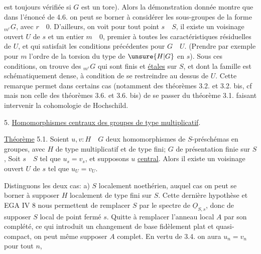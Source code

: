 est toujours vérifiée si $G$ est un tore). Alors la démonstration donnée
montre que dans l'énoncé de 4.6.  on peut se borner à considérer les
sous-groupes de la forme ${}_{m^r}G$, avec $r\quad 0$. D'ailleurs, on voit 
  pour tout point $s\quad S$, il existe un voisinage ouvert $U$ de $s$ 
et un entier $m\quad 0$, premier à toutes les caractéristiques 
résiduelles de $U$, et qui satisfait les conditions précédentes pour $G\quad U$.
(Prendre par exemple pour $m$ l'ordre de la torsion du type de $\unsure{H|G}$ 
en $s$). Sous ces conditions, on trouve des ${}_{m^r}G$ qui sont finis et
\uline{étales} sur $S$, et dont la famille est schématiquement dense, à condition
de se restreindre au dessus de $U$. Cette remarque permet dans certains
cas (notamment   des théorèmes 3.2. et 3.2. bis, cf
mais non celle des théorèmes 3.6. et 3.6. bis) de se passer du théorème 3.1. faisant intervenir la cohomologie de Hochschild. 

5. \uline{Homomorphismes centraux des groupes de type multiplicatif}.

\uline{Théorème} 5.1. Soient $u,v:H\quad G$ deux homomorphismes de $S$-préschémas en groupes, avec $H$ de type multiplicatif et de type fini;  $G$ de présentation finie sur $S$, 
Soit $s\quad S$ tel que $u_s=v_s$, et supposons $u$ \uline{central}. Alors il existe
un voisinage ouvert $U$ de $s$ tel que $u_U=v_U$.

Distinguons les deux cas: a) $S$ localement noethérien, auquel cas
on peut se borner à supposer $H$ localement de type fini sur $S$. Cette
dernière hypothèse et EGA IV 8 nous permettent de remplacer $S$ par
le spectre de $\underline{O}_{S,s}$, donc de supposer $S$ local de point fermé $s$. Quitte
à remplacer l'anneau local $A$ par son complété, ce qui introduit un
changement de base fidèlement plat et quasi-compact, on peut même supposer $A$ complet. En vertu de 3.4. on aura $u_n=v_n$ pour tout $n$,


